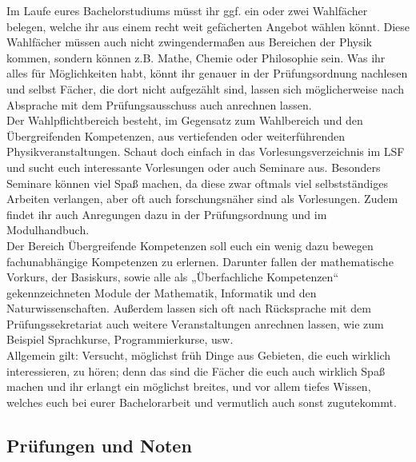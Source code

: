 Im Laufe eures Bachelorstudiums müsst ihr ggf. ein oder zwei Wahlfächer belegen, welche ihr aus einem recht weit gefächerten Angebot wählen könnt. Diese Wahlfächer müssen auch nicht zwingendermaßen aus Bereichen der Physik kommen, sondern können z.B. Mathe, Chemie oder Philosophie sein. Was ihr alles für Möglichkeiten habt, könnt ihr genauer in der Prüfungsordnung nachlesen und selbst Fächer, die dort nicht aufgezählt sind, lassen sich möglicherweise nach Absprache mit dem Prüfungsausschuss auch anrechnen lassen.\\

Der Wahlpflichtbereich besteht, im Gegensatz zum Wahlbereich und den Übergreifenden Kompetenzen, aus vertiefenden oder weiterführenden Physikveranstaltungen. Schaut doch einfach in das Vorlesungsverzeichnis im LSF und sucht euch interessante Vorlesungen oder auch Seminare aus. Besonders Seminare können viel Spaß machen, da diese zwar oftmals viel selbstständiges Arbeiten verlangen, aber oft auch forschungsnäher sind als Vorlesungen. Zudem findet ihr auch Anregungen dazu in der Prüfungsordnung und im Modulhandbuch.\\

Der Bereich Übergreifende Kompetenzen soll euch ein wenig dazu bewegen fachunabhängige Kompetenzen zu erlernen. Darunter fallen der mathematische Vorkurs, der Basiskurs, sowie alle als „Überfachliche Kompetenzen“ gekennzeichneten Module der Mathematik, Informatik und den Naturwissenschaften. Außerdem lassen sich oft nach Rücksprache mit dem Prüfungssekretariat auch weitere Veranstaltungen anrechnen lassen, wie zum Beispiel Sprachkurse, Programmierkurse, usw.\\

Allgemein gilt: Versucht, möglichst früh Dinge aus Gebieten, die euch wirklich interessieren, zu hören; denn das sind die Fächer die euch auch wirklich Spaß machen und ihr erlangt ein möglichst breites, und vor allem tiefes Wissen, welches euch bei eurer Bachelorarbeit und vermutlich auch sonst zugutekommt.

\subsection{Prüfungen und Noten}

